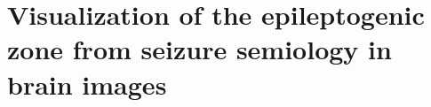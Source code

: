 \chapter[Visualization of the epileptogenic zone in brain images]{Visualization of the epileptogenic zone from seizure semiology in brain images}

\label{chap:svt}
\minitoc


\acresetall
\doublespacing

\onehalfspacing %
